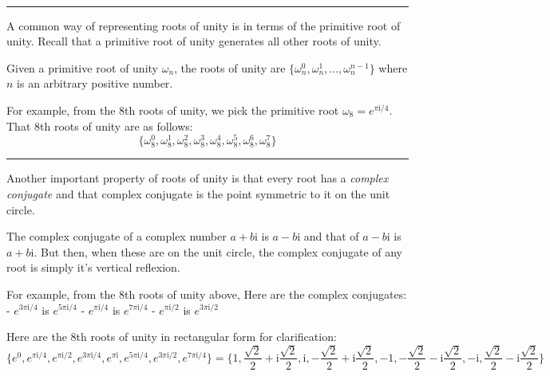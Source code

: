 \documentclass[11pt]{article}
\begin{document}
    \begin{center}
    \end{center}
    { \hspace*{\fill} \\}
    
    \begin{center}\rule{0.5\linewidth}{0.5pt}\end{center}

    A common way of representing roots of unity is in terms of the primitive
root of unity. Recall that a primitive root of unity generates all other
roots of unity.

Given a primitive root of unity \(\omega_n\), the roots of unity are
\(\{\omega_n^{0}, \omega_n^{1}, ... , \omega_n^{n - 1}\}\) where \(n\)
is an arbitrary positive number.

For example, from the \(8\)th roots of unity, we pick the primitive root
\(\omega_8 = e^{{\pi\mathrm{i}}/4}\). That \(8\)th roots of unity are as
follows:
\[\{\omega_8^0, \omega_8^1, \omega_8^2, \omega_8^3, \omega_8^4, \omega_8^5, \omega_8^6, \omega_8^7\}\]

    \begin{center}\rule{0.5\linewidth}{0.5pt}\end{center}

    Another important property of roots of unity is that every root has a
\emph{complex conjugate} and that complex conjugate is the point
symmetric to it on the unit circle.

The complex conjugate of a complex number \(a + b\mathrm{i}\) is
\(a - b\mathrm{i}\) and that of \(a - b\mathrm{i}\) is
\(a + b\mathrm{i}\). But then, when these are on the unit circle, the
complex conjugate of any root is simply it's vertical reflexion.

For example, from the \(8\)th roots of unity above, Here are the complex
conjugates: - \(e^{3\pi\mathrm{i}/4}\) is \(e^{5\pi\mathrm{i}/4}\) -
\(e^{\pi\mathrm{i}/4}\) is \(e^{7\pi\mathrm{i}/4}\) -
\(e^{\pi\mathrm{i}/2}\) is \(e^{3\pi\mathrm{i}/2}\)

Here are the \(8\)th roots of unity in rectangular form for
clarification:
\(\{ e^{0}, e^{{\pi\mathrm{i}}/4}, e^{{\pi\mathrm{i}}/2}, e^{{3\pi\mathrm{i}}/4}, e^{\pi\mathrm{i}}, e^{{5\pi\mathrm{i}}/4}, e^{{3\pi\mathrm{i}}/2}, e^{{7\pi\mathrm{i}}/4} \} = \{ 1, \dfrac{\sqrt{2}}{2} + \mathrm{i}\dfrac{\sqrt{2}}{2}, \mathrm{i}, -\dfrac{\sqrt{2}}{2} + \mathrm{i}\dfrac{\sqrt{2}}{2}, -1, -\dfrac{\sqrt{2}}{2} - \mathrm{i}\dfrac{\sqrt{2}}{2}, - \mathrm{i}, \dfrac{\sqrt{2}}{2} - \mathrm{i}\dfrac{\sqrt{2}}{2} \}\)
\end{document}
